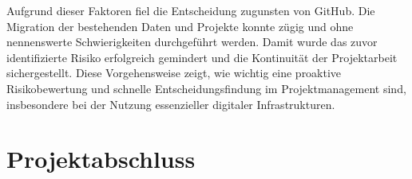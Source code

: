 \documentclass[12pt,oneside]{article}
\begin{document}
Aufgrund dieser Faktoren fiel die Entscheidung zugunsten von GitHub. Die Migration der bestehenden Daten und Projekte konnte zügig und ohne nennenswerte Schwierigkeiten durchgeführt werden. Damit wurde das zuvor identifizierte Risiko erfolgreich gemindert und die Kontinuität der Projektarbeit sichergestellt.
Diese Vorgehensweise zeigt, wie wichtig eine proaktive Risikobewertung und schnelle Entscheidungsfindung im Projektmanagement sind, insbesondere bei der Nutzung essenzieller digitaler Infrastrukturen.


\section{Projektabschluss}




\clearpage



\appendix
\end{document}
